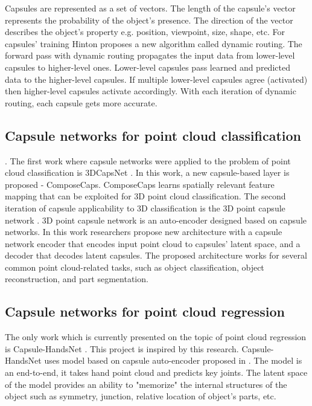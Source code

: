 Capsules are represented as a set of vectors. The length of the capsule's vector represents the probability of the object's presence. The direction of the vector describes the object's property e.g. position, viewpoint, size, shape, etc. For capsules' training Hinton proposes a new algorithm \parencite{sabour_dynamic_2017} called dynamic routing. The forward pass with dynamic routing propagates the input data from lower-level capsules to higher-level ones. Lower-level capsules pass learned and predicted data to the higher-level capsules. If multiple lower-level capsules agree (activated) then higher-level capsules activate accordingly. With each iteration of dynamic routing, each capsule gets more accurate.

\subsection{Capsule networks for point cloud classification}. The first work where capsule networks were applied to the problem of point cloud classification is 3DCapsNet \parencite{cheraghian_3dcapsule_2018}. In this work, a new capsule-based layer is proposed - ComposeCaps. ComposeCaps learns spatially relevant feature mapping that can be exploited for 3D point cloud classification.
The second iteration of capsule applicability to 3D classification is the 3D point capsule network \parencite{zhao_3d_2019}. 3D point capsule network is an auto-encoder designed based on capsule networks. In this work researchers propose new architecture with a capsule network encoder that encodes input point cloud to capsules' latent space, and a decoder that decodes latent capsules. The proposed architecture works for several common point cloud-related tasks, such as object classification, object reconstruction, and part segmentation.

\subsection{Capsule networks for point cloud regression} 
The only work which is currently presented on the topic of point cloud regression is Capsule-HandsNet \parencite{wu_3d_2020}. This project is inspired by this research. Capsule-HandsNet uses model based on capsule auto-encoder proposed in \cite{zhao_3d_2019}. The model is an end-to-end, it takes hand point cloud and predicts key joints. The latent space of the model provides an ability to "memorize" the internal structures of the object such as symmetry, junction, relative location of object's parts, etc.
